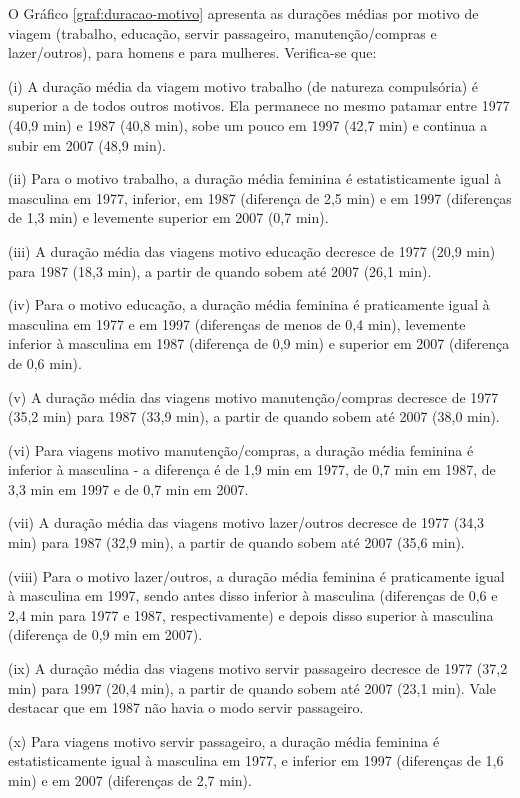 O Gráfico \ref{graf:duracao-motivo} apresenta as durações médias por motivo de viagem (trabalho, educação, servir passageiro, manutenção/compras e lazer/outros), para homens e para mulheres. Verifica-se que:
\begin{compactitem}[]
\item (i) A duração média da viagem motivo trabalho (de natureza compulsória) é superior a de todos outros motivos. Ela permanece no mesmo patamar entre 1977 (40,9 min) e 1987 (40,8 min), sobe um pouco em 1997 (42,7 min) e continua a subir em 2007 (48,9 min).
\item (ii) Para o motivo trabalho, a duração média feminina é estatisticamente igual à masculina em 1977, inferior, em 1987 (diferença de 2,5 min) e em 1997 (diferenças de 1,3 min) e levemente superior em 2007 (0,7 min).
\item (iii) A duração média das viagens motivo educação decresce de 1977 (20,9 min) para 1987 (18,3 min), a partir de quando sobem até 2007 (26,1 min).
\item (iv) Para o motivo educação, a duração média feminina é praticamente igual à masculina em 1977 e em 1997 (diferenças de menos de 0,4 min), levemente inferior à masculina em 1987 (diferença de 0,9 min) e superior em 2007 (diferença de 0,6 min).
\item (v) A duração média das viagens motivo manutenção/compras decresce de 1977 (35,2 min) para 1987 (33,9 min), a partir de quando sobem até 2007 (38,0 min).
\item (vi) Para viagens motivo manutenção/compras, a duração média feminina é inferior à masculina - a diferença é de 1,9 min em 1977, de 0,7 min em 1987, de 3,3 min em 1997 e de 0,7 min em 2007.
\item (vii) A duração média das viagens motivo lazer/outros decresce de 1977 (34,3 min) para 1987 (32,9 min), a partir de quando sobem até 2007 (35,6 min).
\item (viii) Para o motivo lazer/outros, a duração média feminina é praticamente igual à masculina em 1997, sendo antes disso inferior à masculina (diferenças de 0,6 e 2,4 min para 1977 e 1987, respectivamente) e depois disso superior à masculina (diferença de 0,9 min em 2007).
\item (ix) A duração média das viagens motivo servir passageiro decresce de 1977 (37,2 min) para 1997 (20,4 min), a partir de quando sobem até 2007 (23,1 min). Vale destacar que em 1987 não havia o modo servir passageiro.
\item (x) Para viagens motivo servir passageiro,  a duração média feminina é estatisticamente igual à masculina em 1977, e inferior em 1997 (diferenças de 1,6 min) e em 2007 (diferenças de 2,7 min).
\end{compactitem}


